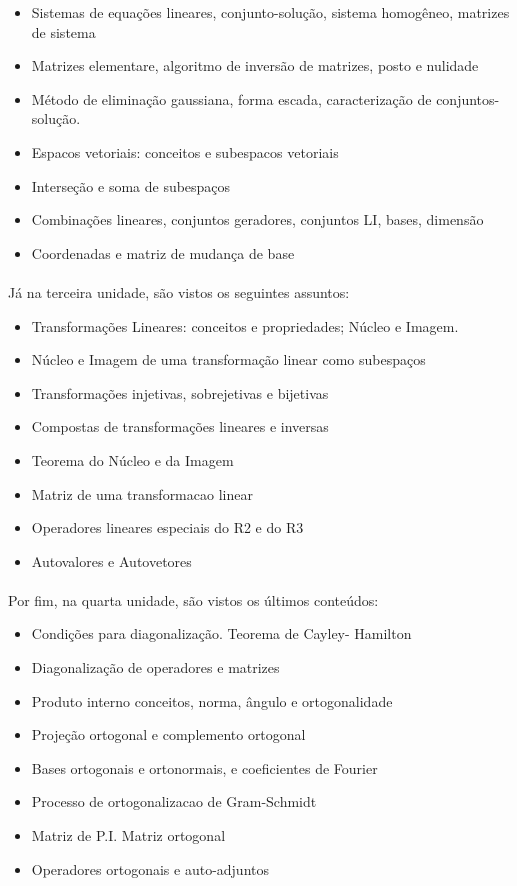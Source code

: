 \documentclass[14pt, a4paper]{article}
\begin{document}
\begin{itemize}
  \item Sistemas de equações lineares, conjunto-solução, sistema homogêneo, matrizes de sistema
  \item Matrizes elementare, algoritmo de inversão de matrizes, posto e nulidade
  \item Método de eliminação gaussiana, forma escada, caracterização de conjuntos-solução.
  \item Espacos vetoriais: conceitos e subespacos vetoriais
  \item Interseção e soma de subespaços
  \item Combinações lineares, conjuntos geradores, conjuntos LI, bases, dimensão
  \item Coordenadas e matriz de mudança de base
\end{itemize}

\paragraph{}

Já na terceira unidade, são vistos os seguintes assuntos:

\begin{itemize}
  \item Transformações Lineares: conceitos e
propriedades; Núcleo e Imagem.
  \item Núcleo e Imagem de uma transformação linear como subespaços
  \item Transformações injetivas, sobrejetivas e
bijetivas 
  \item Compostas de transformações lineares e
inversas
  \item Teorema do Núcleo e da Imagem
  \item Matriz de uma transformacao linear
  \item Operadores lineares especiais do R2 e do R3
  \item Autovalores e Autovetores
\end{itemize}

\paragraph{}

Por fim, na quarta unidade, são vistos os últimos conteúdos:

 \begin{itemize}
    \item Condições para diagonalização. Teorema de
Cayley- Hamilton
    \item Diagonalização de operadores e matrizes
    \item Produto interno conceitos, norma, ângulo e
ortogonalidade
    \item Projeção ortogonal e complemento ortogonal
    \item Bases ortogonais e ortonormais, e coeficientes de Fourier
    \item Processo de ortogonalizacao de Gram-Schmidt
    \item Matriz de P.I. Matriz ortogonal
    \item Operadores ortogonais e auto-adjuntos
\end{itemize}
\end{document}

